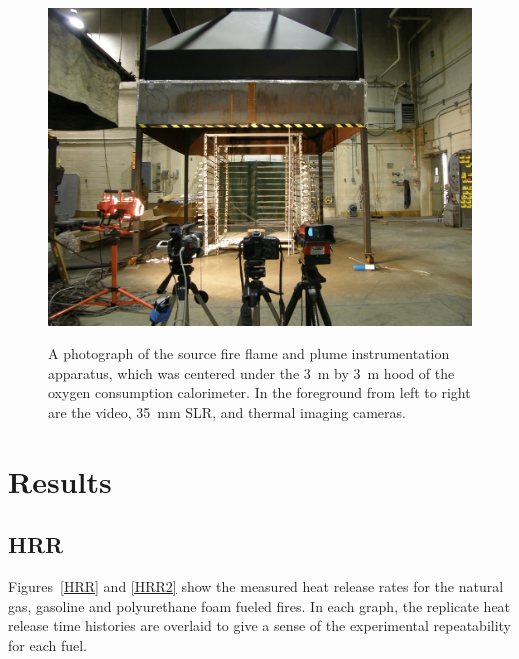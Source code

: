 \documentclass[twoside]{uocthesis}
\begin{document}
{\begin{figure}
  \centering
  \includegraphics[width=\textwidth]{../Figures/Source_Fire_Flamer}\\
  \caption[A photograph of the source fire flame and plume instrumentation apparatus]{A photograph of the source fire flame and plume instrumentation apparatus, which was centered under the 3~m by 3~m hood of the oxygen consumption calorimeter.  In the foreground from left to right are the video, 35~mm SLR, and thermal imaging cameras.}
  \label{Fire_Flamer}
\end{figure}

\section{Results}

\subsection{HRR}

Figures~\ref{HRR} and \ref{HRR2} show the measured heat release rates for the natural gas, gasoline and polyurethane foam fueled fires. In each graph, the replicate heat release time histories are overlaid to give a sense of the experimental repeatability for each fuel.

}
\end{document}
